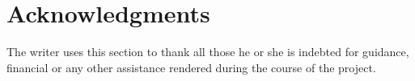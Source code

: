 \chapter*{Acknowledgments}

The writer uses this section to thank all those he or she is indebted for guidance, financial or any other assistance rendered during the course of the project.


